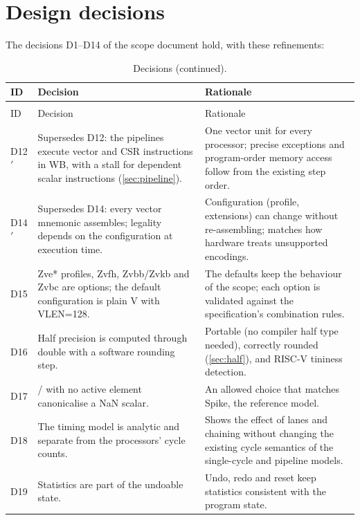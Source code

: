 \documentclass[11pt]{article}
\begin{document}
\section{Design decisions}\label{sec:decisions}

The decisions D1--D14 of the scope document hold, with these refinements:

\small
\begin{longtable}{@{}L{0.9cm}L{6.1cm}L{8.1cm}@{}}
\caption{Decisions added or revised during the implementation.}\label{tab:decisions}\\
\toprule
ID & Decision & Rationale \\
\midrule
\endfirsthead
\caption[]{Decisions (continued).}\\
\toprule
ID & Decision & Rationale \\
\midrule
\endhead
D12$'$ & Supersedes D12: the pipelines execute vector and CSR instructions in WB, with a stall for dependent scalar instructions (\cref{sec:pipeline}). & One vector unit for every processor; precise exceptions and program-order memory access follow from the existing step order. \\
D14$'$ & Supersedes D14: every vector mnemonic assembles; legality depends on the configuration at execution time. & Configuration (profile, extensions) can change without re-assembling; matches how hardware treats unsupported encodings. \\
D15 & Zve* profiles, Zvfh, Zvbb/Zvkb and Zvbc are options; the default configuration is plain V with VLEN=128. & The defaults keep the behaviour of the scope; each option is validated against the specification's combination rules. \\
D16 & Half precision is computed through double with a software rounding step. & Portable (no compiler half type needed), correctly rounded (\cref{sec:half}), and RISC-V tininess detection. \\
D17 & / with no active element canonicalise a NaN scalar. & An allowed choice that matches Spike, the reference model. \\
D18 & The timing model is analytic and separate from the processors' cycle counts. & Shows the effect of lanes and chaining without changing the existing cycle semantics of the single-cycle and pipeline models. \\
D19 & Statistics are part of the undoable state. & Undo, redo and reset keep statistics consistent with the program state. \\
\bottomrule
\end{longtable}
\normalsize
\end{document}
